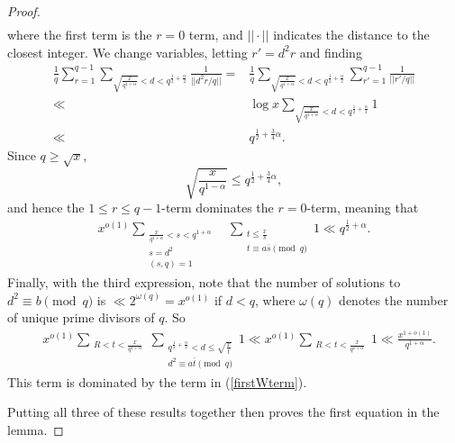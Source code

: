 \documentclass{amsart}
\begin{document}
\begin{proof}
\begin{align*}
\end{align*}
where the first term is the $r=0$ term, and $||\cdot ||$ indicates the distance to the closest integer.  We change variables, letting $r'=d^2r$ and finding
\begin{align*}
\frac 1q\sum_{r=1}^{q-1}\sum_{\sqrt{\frac x{q^{1+\alpha}}}<d<q^{\frac 12+\frac \alpha 2}}\frac{1}{||d^2r/q||}=&\frac 1q\sum_{\sqrt{\frac x{q^{1+\alpha}}}<d<q^{\frac 12+\frac \alpha 2}}\sum_{r'=1}^{q-1}\frac{1}{||r'/q||}\\
\ll &\log x\sum_{\sqrt{\frac x{q^{1+\alpha}}}<d<q^{\frac 12+\frac \alpha 2}}1\\
\ll &q^{\frac 12+\frac 34\alpha}.
\end{align*}
Since $q\geq\sqrt x$,
$$\sqrt{\frac{x}{q^{1-\alpha}}}\leq q^{\frac 12+\frac 34\alpha},$$
and hence the $1\leq r\leq q-1$-term dominates the $r=0$-term, meaning that
\begin{align*}x^{o(1)}\sum_{\substack{\frac{x}{q^{1+\alpha}}<s<q^{1+\alpha} \\ s=d^2 \\ (s,q)=1}}&\sum_{\substack{t\leq \frac xs \\ t\equiv a\bar s\pmod q}}1\ll q^{\frac 12+\alpha}.
\end{align*}
Finally, with the third expression, note that the number of solutions to $d^2\equiv b\pmod q$ is $\ll 2^{\omega(q)}=x^{o(1)}$ if $d<q$, where $\omega(q)$ denotes the number of unique prime divisors of $q$. So
 \begin{align*}
&x^{o(1)}\sum_{\substack{R<t<\frac{x}{q^{1+\alpha}}  }}\sum_{\substack{q^{\frac 12+\frac \alpha 2}<d\leq \sqrt{\frac xt} \\ d^2\equiv a\bar t\pmod q}}1\ll x^{o(1)}\sum_{\substack{R<t<\frac{x}{q^{1+\alpha}}  }}1\ll \frac{x^{1+o(1)}}{q^{1+\alpha}}.
\end{align*}
This term is dominated by the term in (\ref{firstWterm}).

Putting all three of these results together then proves the first equation in the lemma.



\end{proof}
\end{document}
